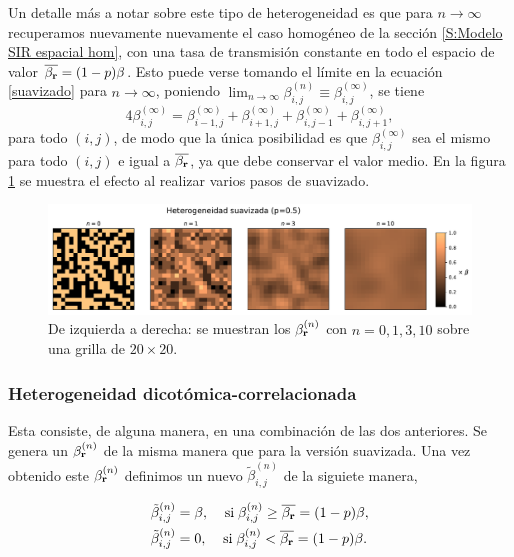 Un detalle más a notar sobre este tipo de heterogeneidad es que para $n\rightarrow\infty$ recuperamos nuevamente nuevamente el caso
homogéneo de la sección \ref{S:Modelo SIR espacial hom}, con una tasa de transmisión constante en todo el espacio de valor 
$\overline{\beta_{\vb r}}=(1-p)\beta$. Esto puede verse tomando el límite en la ecuación \ref{suavizado} para $n\rightarrow\infty$, poniendo 
$\lim_{n\to \infty}\beta^{(n)}_{i,j}\equiv\beta^{(\infty)}_{i,j}$, se tiene
\[
  4\beta^{(\infty)}_{i,j} = \beta^{(\infty)}_{i-1,j} + \beta^{(\infty)}_{i+1,j} + \beta^{(\infty)}_{i,j-1} + \beta^{(\infty)}_{i,j+1},
\]
para todo $(i,j)$, de modo que la única posibilidad es que $\beta^{(\infty)}_{i,j}$ sea el mismo para todo $(i,j)$ e igual a $\overline{\beta_{\vb r}}$, ya que debe
conservar el valor medio. En la figura \ref{fig:nsmoth_step} se muestra el efecto al realizar varios pasos de suavizado.

\begin{figure}[h]
  \centering
  \includegraphics[width=1\textwidth]{nsmoth_step.pdf}
  \caption{De izquierda a derecha: se muestran los $\beta^{(n)}_{\vb r}$ con $n=0,1,3,10$ sobre una grilla de $20\times20$.}
  \label{fig:nsmoth_step}
\end{figure}

\subsubsection*{Heterogeneidad dicotómica-correlacionada}

Esta consiste, de alguna manera, en una combinación de las dos anteriores. Se genera un $\beta^{(n)}_{\vb r}$ de la misma manera que para la versión 
suavizada. Una vez obtenido este $\beta^{(n)}_{\vb r}$ definimos un nuevo $\tilde{\beta}^{(n)}_{i,j}$ de la siguiete manera,

\begin{align*}
  \tilde{\beta}^{(n)}_{i,j} &= \beta, \; \;\;\; \mbox{si}\; \beta^{(n)}_{i,j}\geq\overline{\beta_{\vb r}}=(1-p)\beta,  \\
  \tilde{\beta}^{(n)}_{i,j} &= 0,  \;\;\;\;\mbox{si}\; \beta^{(n)}_{i,j}<\overline{\beta_{\vb r}}=(1-p)\beta.
\end{align*}

